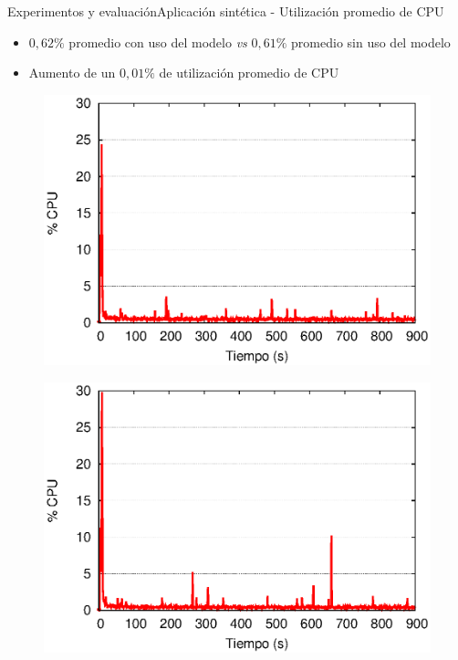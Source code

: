 
\begin{frame}{Experimentos y evaluación}{Aplicación sintética - Utilización promedio de CPU}

\begin{itemize}
\item $0,62\%$ promedio con uso del modelo \textit{vs} $0,61\%$ promedio sin uso del modelo
\item Aumento de un $0,01\%$ de utilización promedio de CPU
\end{itemize}

\begin{multicols}{2}
\begin{figure}[p]
	\centering
	\includegraphics[scale=0.475]{images/exp/app3/cm/fisical/consumeCPU.eps}
\end{figure}

\begin{figure}[p]
	\centering
	\includegraphics[scale=0.475]{images/exp/app3/sm/fisical/consumeCPU.eps}
\end{figure}
\end{multicols}
\end{frame}

